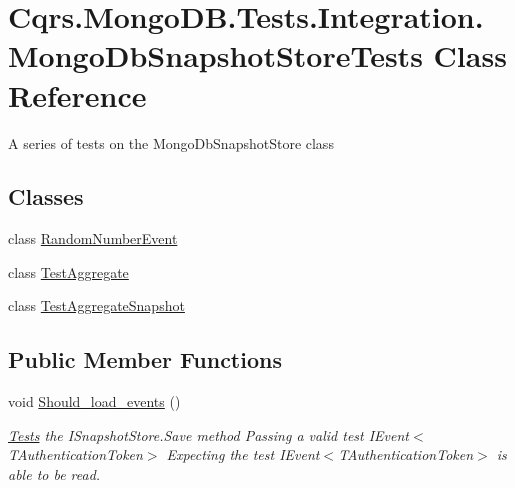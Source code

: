 \hypertarget{classCqrs_1_1MongoDB_1_1Tests_1_1Integration_1_1MongoDbSnapshotStoreTests}{}\section{Cqrs.\+Mongo\+D\+B.\+Tests.\+Integration.\+Mongo\+Db\+Snapshot\+Store\+Tests Class Reference}
\label{classCqrs_1_1MongoDB_1_1Tests_1_1Integration_1_1MongoDbSnapshotStoreTests}


A series of tests on the Mongo\+Db\+Snapshot\+Store class  


\subsection*{Classes}
\begin{DoxyCompactItemize}
\item 
class \hyperlink{classCqrs_1_1MongoDB_1_1Tests_1_1Integration_1_1MongoDbSnapshotStoreTests_1_1RandomNumberEvent}{Random\+Number\+Event}
\item 
class \hyperlink{classCqrs_1_1MongoDB_1_1Tests_1_1Integration_1_1MongoDbSnapshotStoreTests_1_1TestAggregate}{Test\+Aggregate}
\item 
class \hyperlink{classCqrs_1_1MongoDB_1_1Tests_1_1Integration_1_1MongoDbSnapshotStoreTests_1_1TestAggregateSnapshot}{Test\+Aggregate\+Snapshot}
\end{DoxyCompactItemize}
\subsection*{Public Member Functions}
\begin{DoxyCompactItemize}
\item 
void \hyperlink{classCqrs_1_1MongoDB_1_1Tests_1_1Integration_1_1MongoDbSnapshotStoreTests_a424d10448b3ab5ab019f99078f895f83_a424d10448b3ab5ab019f99078f895f83}{Should\+\_\+load\+\_\+events} ()
\begin{DoxyCompactList}\small\item\em \hyperlink{namespaceCqrs_1_1MongoDB_1_1Tests}{Tests} the I\+Snapshot\+Store.\+Save method Passing a valid test I\+Event$<$\+T\+Authentication\+Token$>$ Expecting the test I\+Event$<$\+T\+Authentication\+Token$>$ is able to be read. \end{DoxyCompactList}\end{DoxyCompactItemize}


